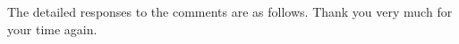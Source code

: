 \documentclass[a4paper,twoside,11pt,dvipsnames]{reviewresponse}
\begin{document}
\begin{itemize}






\end{itemize}

\color{black}
The detailed responses to the comments are as follows. Thank you very much for your time again.



\newpage
\end{document}
